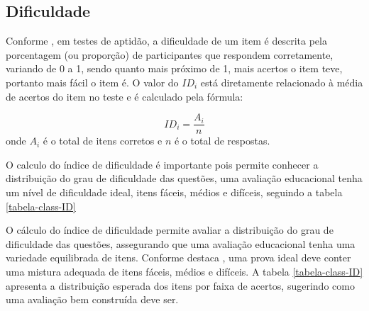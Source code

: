 \subsection{Dificuldade}

Conforme , em testes de aptidão, a dificuldade de um item é descrita pela porcentagem (ou proporção) de participantes que respondem corretamente, variando de 0 a 1, sendo quanto mais próximo de 1, mais acertos o item teve, portanto mais fácil o item é. O valor do $ID_i$ está diretamente relacionado à média de acertos do item no teste e é calculado  pela fórmula: 

\[
	ID_i =\dfrac{A_i}{n} 
\]
onde $A_i$ é o total de itens corretos e $n$ é o total de respostas. 

\begin{comment}
O calculo do índice de dificuldade é importante pois permite conhecer a distribuição do grau de dificuldade das questões que segundo \citeonline{pasquali2003}, para que uma avaliação educacional tenha um nível de dificuldade ideal, os índices devem seguir uma distribuição próxima à curva normal, com itens fáceis, médios e difíceis.
\end{comment}

O calculo do índice de dificuldade é importante pois permite conhecer a distribuição do grau de dificuldade das questões,  uma avaliação educacional tenha um nível de dificuldade ideal, itens fáceis, médios e difíceis, seguindo a tabela \ref{tabela-class-ID}

O cálculo do índice de dificuldade permite avaliar a distribuição do grau de dificuldade das questões, assegurando que uma avaliação educacional tenha uma variedade equilibrada de itens. Conforme destaca , uma prova ideal deve conter uma mistura adequada de itens fáceis, médios e difíceis. A tabela \ref{tabela-class-ID} apresenta a distribuição esperada dos itens por faixa de acertos, sugerindo como  uma avaliação bem construída deve ser.


\begin{table}[H]
\end{table}

